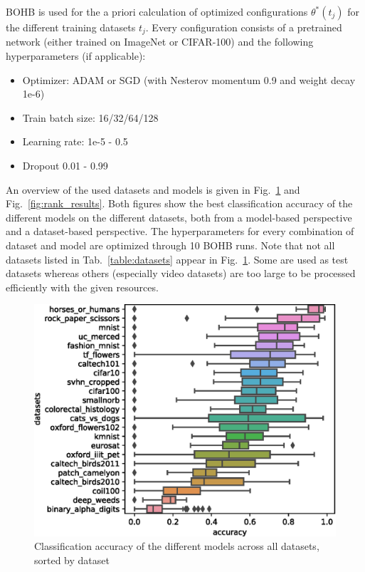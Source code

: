 \documentclass{article}
\begin{document}
BOHB is used for the a priori calculation of optimized configurations $\theta^*(t_j)$ for the different training datasets $t_j$. Every configuration consists of a pretrained network (either trained on ImageNet or CIFAR-100) and the following hyperparameters (if applicable):
%
\begin{itemize}
\item Optimizer: ADAM or SGD (with Nesterov momentum 0.9 and weight decay 1e-6)
\item Train batch size: 16/32/64/128
\item Learning rate: 1e-5 - 0.5
\item Dropout 0.01 - 0.99
\end{itemize}
%
An overview of the used datasets and models is given in Fig.~\ref{fig:dataset_results} and Fig.~\ref{fig:rank_results}. Both figures show the best classification accuracy of the different models on the different datasets, both from a model-based perspective and a dataset-based perspective. The hyperparameters for every combination of dataset and model are optimized through 10 BOHB runs. Note that not all datasets listed in Tab.~\ref{table:datasets} appear in Fig.~\ref{fig:dataset_results}. Some are used as test datasets whereas others (especially video datasets) are too large to be processed efficiently with the given resources.
%
\begin{figure}[htb]
\begin{center}
 	\includegraphics[width=0.95\linewidth]{../figures/dataset_results.eps} 
\end{center}
\caption{Classification accuracy of the different models across all datasets, sorted by dataset}
\label{fig:dataset_results}
\end{figure} 
\end{document}
